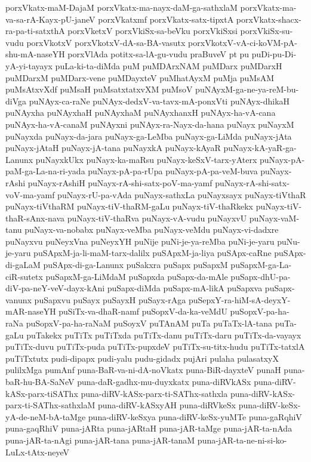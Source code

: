 {porxVkatx-maM-DajaM
porxVkatx-ma-nayx-daM-ga-sathxlaM
porxVkatx-ma-va-sa-rA-Kayx-pU-janeV
porxVkatxmf
porxVkatx-satx-tipxtA
porxVkatx-shacx-ra-pa-ti-satxthA
porxVketxV
porxVkiSx-sa-beVku
porxVkiSxsi
porxVkiSx-su-vudu
porxVkotxV
porxVkotxV-dA-sa-BA-vasutx
porxVkotxV-vA-ci-koVM-pA-shu-mA-naseYH
porxVlAda
potitx-sa-lA-gu-vudu
praBuveV
pt
pu
puDi-pu-Di-yA-yi-tayayx
puLa-ki-ta-diMda
puM
puMDArxNAM
puMDarx
puMDarxH
puMDarxM
puMDarx-vene
puMDayxteV
puMhatAyxM
puMja
puMsAM
puMsAtxvXdf
puMsaH
puMsatxtatxvXM
puMsoV
puNAyxM-ga-ne-ya-reM-bu-diVga
puNAyx-ca-raNe
puNAyx-dedxV-va-tavx-mA-ponxVti
puNAyx-dhikaH
puNAyxha
puNAyxhaH
puNAyxhaM
puNAyxhanxH
puNAyx-ha-vA-cana
puNAyx-ha-vA-canaM
puNAyxni
puNAyx-ra-Nayx-da-hana
puNayx
puNayxM
puNayxda
puNayx-da-jara
puNayx-ga-LeMba
puNayx-ga-LiMda
puNayx-jAta
puNayx-jAtaH
puNayx-jA-tana
puNayxkA
puNayx-kAyaR
puNayx-kA-yaR-ga-Lanunx
puNayxkUkx
puNayx-ka-maRsu
puNayx-keSxV-tarx-yAterx
puNayx-pA-paM-ga-La-na-ri-yada
puNayx-pA-pa-rUpa
puNayx-pA-pa-veM-buva
puNayx-rAshi
puNayx-rAshiH
puNayx-rA-shi-satx-poV-ma-yamf
puNayx-rA-shi-satx-voV-ma-yamf
puNayx-rU-pa-vAda
puNayx-sathxLa
puNayxsayx
puNayx-tiVthaR
puNayx-tiVthaRM
puNayx-tiV-thaRM-gaLu
puNayx-tiV-thaRkekx
puNayx-tiV-thaR-sAnx-nava
puNayx-tiV-thaRva
puNayx-vA-vudu
puNayxvU
puNayx-vaM-tanu
puNayx-va-nobabx
puNayx-veMba
puNayx-veMdu
puNayx-vi-dadxre
puNayxvu
puNeyxVna
puNeyxYH
puNije
puNi-je-ya-reMba
puNi-je-yaru
puNu-je-yaru
puSApxM-ja-li-maM-tarx-dalilx
puSApxM-ja-liya
puSApx-caRne
puSApx-di-gaLaM
puSApx-di-ga-Lanunx
puSakxra
puSapx
puSapxM
puSapxM-ga-La-ciR-sutetx
puSapxM-ga-LiMdaM
puSapxda
puSapx-da-mAle
puSapx-dhU-pa-diV-pa-neY-veV-dayx-kAni
puSapx-diMda
puSapx-mA-likA
puSapxva
puSapx-vanunx
puSapxvu
puSayx
puSayxH
puSayx-rAga
puSepxY-ra-hiM-sA-deyxY-mAR-naseYH
puSiTx-va-dhaR-namf
puSopxV-da-ka-veMdU
puSopxV-pa-ha-raNa
puSopxV-pa-ha-raNaM
puSoyxV
puTAnAM
puTa
puTaTx-lA-tana
puTa-gaLu
puTakekx
puTiTx
puTiTxda
puTiTx-danu
puTiTx-daru
puTiTx-da-vayayx
puTiTx-duvu
puTiTx-puda
puTiTx-pupxdeV
puTiTx-su-titx-hudu
puTiTx-tatxlA
puTiTxtutx
pudi-dipapx
pudi-yalu
pudu-gidadx
pujAri
pulaha
pulasatxyX
pulilxMga
pumAnf
puna-BaR-va-ni-dA-noVkatx
puna-BiR-dayxteV
punaH
puna-baR-hu-BA-SaNeV
puna-daR-gadhx-mu-duyxkatx
puna-diRVkASx
puna-diRV-kASx-parx-tiSAThx
puna-diRV-kASx-parx-ti-SAThx-sathxla
puna-diRV-kASx-parx-ti-SAThx-sathxlaM
puna-diRV-kASxyAH
puna-diRVkeSx
puna-diRV-keSx-yA-de-neM-bA-taMge
puna-diRV-keSxya
puna-diRV-keSx-yuMTe
puna-gaRqhiV
puna-gaqRhiV
puna-jARta
puna-jARtaH
puna-jAR-taMge
puna-jAR-ta-nAda
puna-jAR-ta-nAgi
puna-jAR-tana
puna-jAR-tanaM
puna-jAR-ta-ne-ni-si-ko-LuLx-tAtx-neyeV
}
